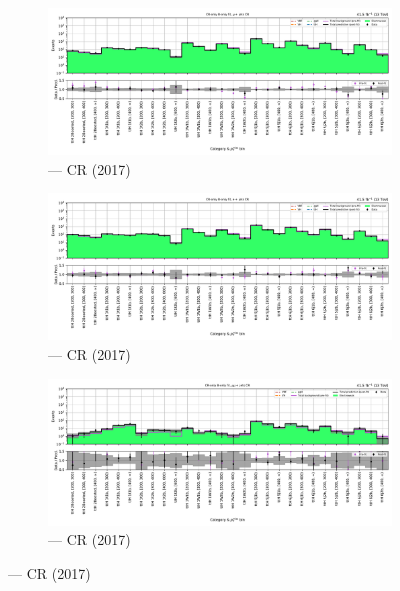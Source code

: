 \begin{figure}[htbp]
    \centering
    \begin{subfigure}[b]{0.65\textwidth}
        \includegraphics[width=\textwidth]{chapters/higgstoinv/figures/mountain_ranges/2017/ttH/Wmunu_tree_fit_b-abs_values_ttH_cats.pdf}
        \caption{\ttH --- \singleMuCr \gls{CR} (2017)}
    \end{subfigure}

    \begin{subfigure}[b]{0.65\textwidth}
        \includegraphics[width=\textwidth]{chapters/higgstoinv/figures/mountain_ranges/2017/ttH/Wenu_tree_fit_b-abs_values_ttH_cats.pdf}
        \caption{\ttH --- \singleEleCr \gls{CR} (2017)}
    \end{subfigure}

    \begin{subfigure}[b]{0.65\textwidth}
        \includegraphics[width=\textwidth]{chapters/higgstoinv/figures/mountain_ranges/2017/ttH/Zmumu_tree_fit_b-abs_values_ttH_cats.pdf}
        \caption{\ttH --- \doubleMuCr \gls{CR} (2017)}
    \end{subfigure}


\end{figure}
